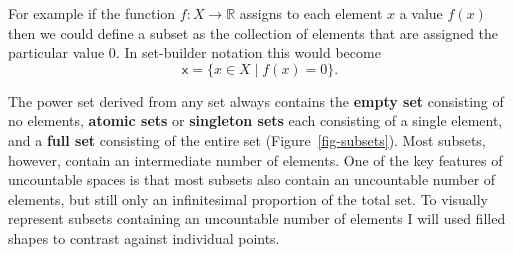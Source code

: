 \documentclass[
  letterpaper,
  DIV=11,
  numbers=noendperiod]{scrartcl}
\begin{document}
For example if the function \(f : X \rightarrow \mathbb{R}\) assigns to
each element \(x\) a value \(f(x)\) then we could define a subset as the
collection of elements that are assigned the particular value \(0\). In
set-builder notation this would become \[
\mathsf{x} = \{ x \in X \mid f(x) = 0 \}.
\]

The power set derived from any set always contains the \textbf{empty
set} consisting of no elements, \textbf{atomic sets} or
\textbf{singleton sets} each consisting of a single element, and a
\textbf{full set} consisting of the entire set
(Figure~\ref{fig-subsets}). Most subsets, however, contain an
intermediate number of elements. One of the key features of uncountable
spaces is that most subsets also contain an uncountable number of
elements, but still only an infinitesimal proportion of the total set.
To visually represent subsets containing an uncountable number of
elements I will used filled shapes to contrast against individual
points.
\end{document}
